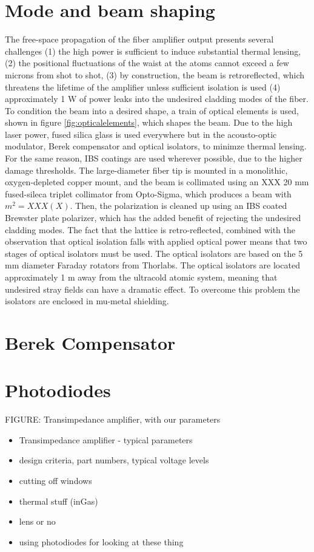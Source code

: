 \documentclass[twocolumn,aps,pra,showpacs,preprintnumbers,bibnotes]{revtex4-1}
\begin{document}
\section{Mode and beam shaping}
The free-space propagation of the fiber amplifier output presents several challenges (1) the high power is sufficient to induce substantial thermal lensing, (2) the positional fluctuations of the waist at the atoms cannot exceed 
a few microns from shot to shot, (3) by construction, the beam is retroreflected, which threatens the lifetime of the amplifier unless sufficient isolation is used (4) approximately 1 W of power leaks into the undesired cladding modes of the fiber. 
To condition the beam into a desired shape, a train of optical elements is used, shown in figure \ref{fig:opticalelements}, which shapes the beam. 
Due to the high laser power, fused silica glass is used everywhere but in the acousto-optic modulator, Berek compensator and optical isolators, to minimze thermal lensing.
For the same reason, IBS coatings are used wherever possible, due to the higher damage thresholds.
The large-diameter fiber tip is mounted in a monolithic, oxygen-depleted copper mount, and the beam is collimated using an XXX 20 mm fused-sileca triplet collimator from Opto-Sigma, which produces a beam with $m^2 = XXX(X)$.
Then, the polarization is cleaned up using an IBS coated Brewster plate polarizer, which has the added benefit of rejecting the undesired cladding modes. 
The fact that the lattice is retro-reflected, combined with the observation that optical isolation falls with applied optical power\cite{LIGO} means that two stages of optical isolators must be used. The optical isolators are based on the 5 mm diameter Faraday rotators from Thorlabs. 
The optical isolators are located approximately 1 m away from the ultracold atomic system, meaning that undesired stray fields can have a dramatic effect.
To overcome this problem the isolators are enclosed in mu-metal shielding.

\section{Berek Compensator}

\section{Photodiodes}
FIGURE: Transimpedance amplifier, with our parameters
\begin{itemize}
	\item Transimpedance amplifier - typical parameters
	\item design criteria, part numbers, typical voltage levels
	\item cutting off windows
	\item thermal stuff (inGas)
	\item lens or no
	\item using photodiodes for looking at these thing
\end{itemize}
\end{document}
